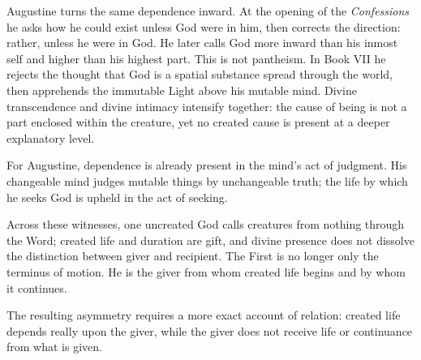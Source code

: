 Augustine turns the same dependence inward. At the opening of the \emph{Confessions} he asks how he could exist unless God were in him, then corrects the direction: rather, unless he were in God. He later calls God more inward than his inmost self and higher than his highest part. This is not pantheism. In Book VII he rejects the thought that God is a spatial substance spread through the world, then apprehends the immutable Light above his mutable mind. Divine transcendence and divine intimacy intensify together: the cause of being is not a part enclosed within the creature, yet no created cause is present at a deeper explanatory level.

For Augustine, dependence is already present in the mind's act of judgment. His changeable mind judges mutable things by unchangeable truth; the life by which he seeks God is upheld in the act of seeking.

Across these witnesses, one uncreated God calls creatures from nothing through the Word; created life and duration are gift, and divine presence does not dissolve the distinction between giver and recipient. The First is no longer only the terminus of motion. He is the giver from whom created life begins and by whom it continues.

The resulting asymmetry requires a more exact account of relation: created life depends really upon the giver, while the giver does not receive life or continuance from what is given.

